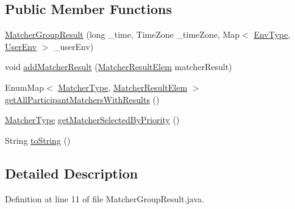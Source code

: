 \subsection*{\-Public \-Member \-Functions}
\begin{DoxyCompactItemize}
\item 
\hyperlink{classlab_1_1davidahn_1_1appshuttle_1_1predict_1_1matcher_1_1_matcher_group_result_a2b95a9a43cb8642efdaa940f0fed6cc4}{\-Matcher\-Group\-Result} (long \-\_\-time, \-Time\-Zone \-\_\-time\-Zone, \-Map$<$ \hyperlink{enumlab_1_1davidahn_1_1appshuttle_1_1collect_1_1env_1_1_env_type}{\-Env\-Type}, \hyperlink{classlab_1_1davidahn_1_1appshuttle_1_1collect_1_1env_1_1_user_env}{\-User\-Env} $>$ \-\_\-user\-Env)
\item 
void \hyperlink{classlab_1_1davidahn_1_1appshuttle_1_1predict_1_1matcher_1_1_matcher_group_result_a059c4f01b60e07f370a9d4a30dafca6e}{add\-Matcher\-Result} (\hyperlink{classlab_1_1davidahn_1_1appshuttle_1_1predict_1_1matcher_1_1_matcher_result_elem}{\-Matcher\-Result\-Elem} matcher\-Result)
\item 
\-Enum\-Map$<$ \hyperlink{enumlab_1_1davidahn_1_1appshuttle_1_1predict_1_1matcher_1_1_matcher_type}{\-Matcher\-Type}, \*
\hyperlink{classlab_1_1davidahn_1_1appshuttle_1_1predict_1_1matcher_1_1_matcher_result_elem}{\-Matcher\-Result\-Elem} $>$ \hyperlink{classlab_1_1davidahn_1_1appshuttle_1_1predict_1_1matcher_1_1_matcher_group_result_ab85c456a5c113c3a0261399a872894ac}{get\-All\-Participant\-Matchers\-With\-Results} ()
\item 
\hyperlink{enumlab_1_1davidahn_1_1appshuttle_1_1predict_1_1matcher_1_1_matcher_type}{\-Matcher\-Type} \hyperlink{classlab_1_1davidahn_1_1appshuttle_1_1predict_1_1matcher_1_1_matcher_group_result_a6783a70a9ac6f5b48366ec708c431ca5}{get\-Matcher\-Selected\-By\-Priority} ()
\item 
\-String \hyperlink{classlab_1_1davidahn_1_1appshuttle_1_1predict_1_1matcher_1_1_matcher_group_result_a8d1d316a3ab35aecf199bba5dec2ceaa}{to\-String} ()
\end{DoxyCompactItemize}


\subsection{\-Detailed \-Description}


\-Definition at line 11 of file \-Matcher\-Group\-Result.\-java.



